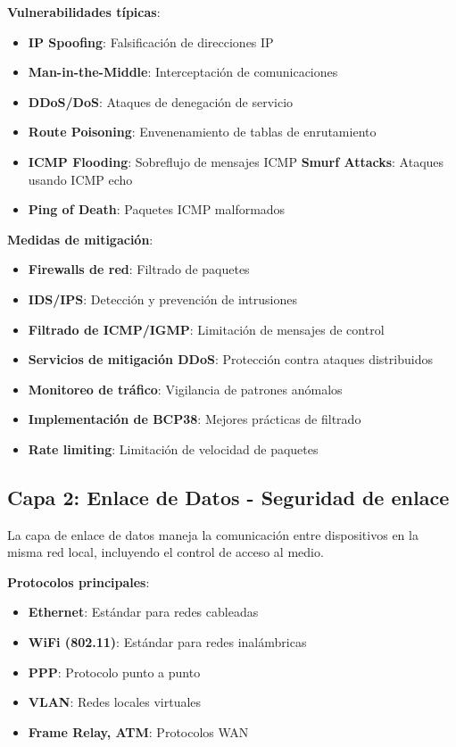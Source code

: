 \textbf{Vulnerabilidades típicas}:
\begin{itemize}
    \item \textbf{IP Spoofing}: Falsificación de direcciones IP
    \item \textbf{Man-in-the-Middle}: Interceptación de comunicaciones
    \item \textbf{DDoS/DoS}: Ataques de denegación de servicio
    \item \textbf{Route Poisoning}: Envenenamiento de tablas de enrutamiento
    \item \textbf{ICMP Flooding}: Sobreflujo de mensajes ICMP
    \textbf{Smurf Attacks}: Ataques usando ICMP echo
    \item \textbf{Ping of Death}: Paquetes ICMP malformados
\end{itemize}

\textbf{Medidas de mitigación}:
\begin{itemize}
    \item \textbf{Firewalls de red}: Filtrado de paquetes
    \item \textbf{IDS/IPS}: Detección y prevención de intrusiones
    \item \textbf{Filtrado de ICMP/IGMP}: Limitación de mensajes de control
    \item \textbf{Servicios de mitigación DDoS}: Protección contra ataques distribuidos
    \item \textbf{Monitoreo de tráfico}: Vigilancia de patrones anómalos
    \item \textbf{Implementación de BCP38}: Mejores prácticas de filtrado
    \item \textbf{Rate limiting}: Limitación de velocidad de paquetes
\end{itemize}

\subsection{Capa 2: Enlace de Datos - Seguridad de enlace}

La capa de enlace de datos maneja la comunicación entre dispositivos en la misma red local, incluyendo el control de acceso al medio.

\textbf{Protocolos principales}:
\begin{itemize}
    \item \textbf{Ethernet}: Estándar para redes cableadas
    \item \textbf{WiFi (802.11)}: Estándar para redes inalámbricas
    \item \textbf{PPP}: Protocolo punto a punto
    \item \textbf{VLAN}: Redes locales virtuales
    \item \textbf{Frame Relay, ATM}: Protocolos WAN
\end{itemize}

